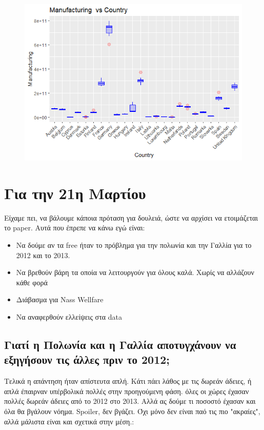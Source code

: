 \documentclass[a4paper,twoside,10pt]{article}
\begin{document}
\begin{figure}[H]
	\centering
	\includegraphics[width=0.5\linewidth]{images/boxplot_Manufacturing}
	\caption{}
	\label{fig:boxplotmanufacturing}
\end{figure}
\section{Για την 21η Μαρτίου}
Είχαμε πει, να βάλουμε κάποια πρόταση για δουλειά, ώστε να αρχίσει να ετοιμάζεται το paper. 
Αυτά που έπρεπε να κάνω εγώ είναι:
\begin{itemize}
	\item Να δούμε αν τα free ήταν το πρόβλημα για την πολωνία και την Γαλλία για το 2012 και το 2013.
	\item Να βρεθούν βάρη τα οποία να λειτουργούν για όλους καλά. Χωρίς να αλλάζουν κάθε φορά
	\item Διάβασμα για Nass Wellfare
	\item Να αναφερθούν ελλείψεις στα data
	\end {itemize}
	
	\subsection{Γιατί η Πολωνία και η Γαλλία αποτυγχάνουν να εξηγήσουν τις άλλες πριν το 2012;}
	Τελικά η απάντηση ήταν απίστευτα απλή. Κάτι πάει λάθος με τις δωρεάν άδειες, ή απλά έπαιρναν υπέρβολικά πολλές στην προηγούμενη φάση. όλες οι χώρες έχασαν πολλές δωρεάν άδειες από το 2012 στο 2013. Αλλά ας δούμε τι ποσοστό έχασαν και όλα θα βγάλουν νόημα. Spoiler, δεν βγάζει. Όχι μόνο δεν είναι παό τις πιο "ακραίες", αλλά μάλιστα είναι και σχετικά στην μέση.:
\end{document}
